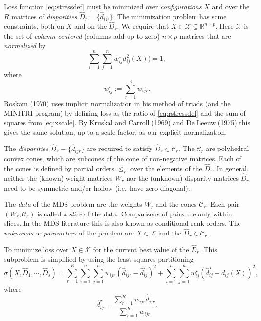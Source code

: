 \documentclass[
  12pt,
]{article}
\begin{document}
Loss function \eqref{eq:stressdef} must be minimized over \emph{configurations} \(X\) and over the \(R\) matrices of \emph{disparities} \(\hat D_r=\{\hat d_{ijr}\}\). The minimization problem has some constraints, both on \(X\) and on the \(\hat D_r\).
We require that \(X\in\mathcal{X}\subseteq\mathbb{R}^{n\times p}\). Here \(\mathcal{X}\) is the set of \emph{column-centered} (columns add up to zero) \(n\times p\) matrices that are \emph{normalized} by
\begin{equation}
\sum_{i=1}^n\sum_{j=1}^n w_{ij}^\star d_{ij}^2(X))=1,
\label{eq:xscale}
\end{equation}
where
\begin{equation}
w_{ij}^\star:=\sum_{r=1}^R w_{ijr}.
\label{eq:wstardef}
\end{equation}
Roskam (1970) uses implicit normalization in his method of triads (and the
MINITRI program) by defining loss as the ratio of \eqref{eq:rstressdef} and the sum of squares from \eqref{eq:xscale}. By Kruskal and Carroll (1969) and De Leeuw (1975)
this gives the same solution, up to a scale factor, as our explicit normalization.

The \emph{disparities} \(\hat D_r=\{\hat d_{ijr}\}\) are required to satisfy \(\hat D_r\in\mathcal{C}_r\). The \(\mathcal{C}_r\) are polyhedral convex cones, which are subcones of the cone of non-negative matrices. Each of the cones is defined by partial orders \(\leq_r\) over the elements of the \(\hat D_r\). In general, neither the (known) weight matrices \(W_r\) nor the (unknown) disparity matrices \(\hat D_r\) need to be symmetric and/or hollow (i.e.~have zero diagonal).

The \emph{data} of the MDS problem are the weights \(W_r\) and the cones \(\mathcal{C}_r\). Each pair \((W_r,\mathcal{C}_r)\) is called a \emph{slice} of the data. Comparisons of pairs are only within slices. In the MDS literature this is also known as conditional rank orders. The \emph{unknowns} or \emph{parameters} of the problem are \(X\in\mathcal{X}\) and the \(\hat D_r\in\mathcal{C}_r\).

To minimize loss over \(X\in\mathcal{X}\) for the current best value of the \(\hat D_r\). This subproblem is simplified by using the least squares partitioning
\begin{equation}
\sigma(X,\hat D_1,\cdots,\hat D_s)=\sum_{r=1}^R\sum_{i=1}^n\sum_{j=1}^nw_{ijr}(\hat d_{ijr}-\hat d_{ij}^\star)^2+\sum_{i=1}^n\sum_{j=1}^nw_{ij}^\star(\hat d_{ij}^\star-d_{ij}(X))^2,
\label{eq:stresspart}
\end{equation}
where
\begin{equation}
\hat d_{ij}^\star=\frac{\sum_{r=1}^R w_{ijr}\hat d_{ijr}}{\sum_{r=1}^R w_{ijr}}.
\label{eq:deltastardef}
\end{equation}
\end{document}

